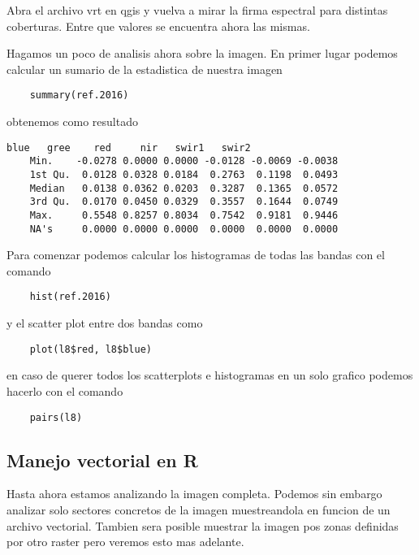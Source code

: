 \begin{act} 
   Abra el archivo vrt en qgis y vuelva a mirar la firma espectral para 
   distintas coberturas. Entre que valores se encuentra ahora las mismas.
\end{act}

\begin{exa}

    Hagamos un poco de analisis ahora sobre la imagen. En primer lugar podemos
    calcular un sumario de la estadistica de nuestra imagen
    \begin{lstlisting}
    summary(ref.2016)   
    \end{lstlisting}
    obtenemos como resultado
    \begin{Verbatim}[fontsize=\small]
               blue   gree    red     nir   swir1   swir2
    Min.    -0.0278 0.0000 0.0000 -0.0128 -0.0069 -0.0038
    1st Qu.  0.0128 0.0328 0.0184  0.2763  0.1198  0.0493
    Median   0.0138 0.0362 0.0203  0.3287  0.1365  0.0572
    3rd Qu.  0.0170 0.0450 0.0329  0.3557  0.1644  0.0749
    Max.     0.5548 0.8257 0.8034  0.7542  0.9181  0.9446
    NA's     0.0000 0.0000 0.0000  0.0000  0.0000  0.0000
    \end{Verbatim}
    Para comenzar podemos calcular los histogramas de todas las bandas con el 
    comando
    \begin{lstlisting}
    hist(ref.2016) 
    \end{lstlisting}

    y el scatter plot entre dos bandas como

    \begin{lstlisting}
    plot(l8$red, l8$blue)    
    \end{lstlisting}

    en caso de querer todos los scatterplots e histogramas en un solo grafico
    podemos hacerlo con el comando
    \begin{lstlisting}
    pairs(l8)
    \end{lstlisting}
    \end{exa}


\subsection{Manejo vectorial en R}

Hasta ahora estamos analizando la imagen completa. Podemos sin embargo analizar
solo sectores concretos de la imagen muestreandola en funcion de un archivo
vectorial. Tambien sera posible muestrar la imagen pos zonas definidas por otro
raster pero veremos esto mas adelante.

